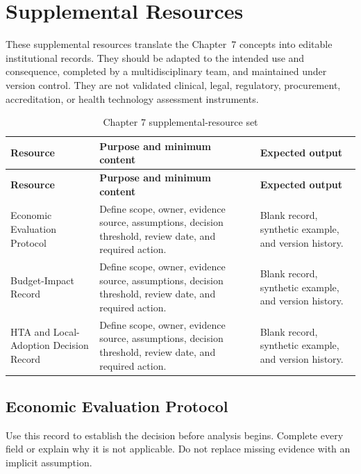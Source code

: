 \section{Supplemental Resources}
\label{sec:comp-ch07-supplemental}

These supplemental resources translate the Chapter~7 concepts into editable
institutional records. They should be adapted to the intended use and consequence,
completed by a multidisciplinary team, and maintained under version control. They
are not validated clinical, legal, regulatory, procurement, accreditation, or health
technology assessment instruments.

\begin{longtable}{@{}p{}p{}p{}@{}}
\caption{Chapter 7 supplemental-resource set}
\label{tab:comp-ch07-supplemental-set}\\
\toprule
\textbf{Resource} & \textbf{Purpose and minimum content} & \textbf{Expected output} \\
\midrule
\endfirsthead
\toprule
\textbf{Resource} & \textbf{Purpose and minimum content} & \textbf{Expected output} \\
\midrule
\endhead
\bottomrule
\endlastfoot
Economic Evaluation Protocol & Define scope, owner, evidence source, assumptions, decision threshold, review date, and required action. & Blank record, synthetic example, and version history. \\
Budget-Impact Record & Define scope, owner, evidence source, assumptions, decision threshold, review date, and required action. & Blank record, synthetic example, and version history. \\
HTA and Local-Adoption Decision Record & Define scope, owner, evidence source, assumptions, decision threshold, review date, and required action. & Blank record, synthetic example, and version history. \\
\end{longtable}

\subsection{Economic Evaluation Protocol}
\label{sec:comp-ch07-supp-1}
Use this record to establish the decision before analysis begins. Complete every
field or explain why it is not applicable. Do not replace missing evidence with an
implicit assumption.


